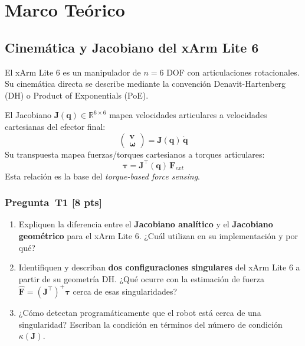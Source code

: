 \documentclass[journal,10pt,twoside]{IEEEtran}
\newcommand{\pts}[1]{\textbf{\color{tec_red}[#1 pts]}}
\begin{document}
\section{Marco Teórico}
\label{sec:background}

\subsection{Cinemática y Jacobiano del xArm Lite 6}

El xArm Lite 6 es un manipulador de $n=6$ DOF con articulaciones
rotacionales. Su cinemática directa se describe mediante la convención
Denavit-Hartenberg (DH) o Product of Exponentials (PoE).

\begin{theorybox}
  El Jacobiano $\bm{J}(\bm{q}) \in \mathbb{R}^{6\times6}$ mapea
  velocidades articulares a velocidades cartesianas del efector final:
  \[
    \begin{pmatrix} \bm{v} \\ \bm{\omega} \end{pmatrix} = \bm{J}(\bm{q})\,\dot{\bm{q}}
  \]
  Su transpuesta mapea fuerzas/torques cartesianos a torques articulares:
  \[
    \bm{\tau} = \bm{J}^\top(\bm{q})\,\bm{F}_{ext}
  \]
  Esta relación es la base del \emph{torque-based force sensing}.
\end{theorybox}

\subsubsection*{Pregunta~T1 \pts{8}}
\begin{enumerate}[label=(\alph*)]
  \item Expliquen la diferencia entre el \textbf{Jacobiano analítico}
        y el \textbf{Jacobiano geométrico} para el xArm Lite 6.
        ¿Cuál utilizan en su implementación y por qué?
  \item Identifiquen y describan \textbf{dos configuraciones singulares}
        del xArm Lite 6 a partir de su geometría DH. ¿Qué ocurre con la
        estimación de fuerza $\hat{\bm{F}} = (\bm{J}^\top)^+\bm{\tau}$
        cerca de esas singularidades?
  \item ¿Cómo detectan programáticamente que el robot está cerca de
        una singularidad? Escriban la condición en términos del
        número de condición $\kappa(\bm{J})$.
\end{enumerate}
\end{document}
